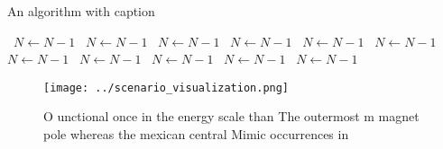 \documentclass[a4paper]{article}
\begin{document}
\begin{algorithm}
\caption{An algorithm with caption}
\begin{algorithmic}
\    \State $N \gets N - 1$
\    \State $N \gets N - 1$
\    \State $N \gets N - 1$
\    \State $N \gets N - 1$
\    \State $N \gets N - 1$
\    \State $N \gets N - 1$
\    \State $N \gets N - 1$
\    \State $N \gets N - 1$
\    \State $N \gets N - 1$
\    \State $N \gets N - 1$
\    \State $N \gets N - 1$
\EndWhile
\end{algorithmic}
\end{algorithm}

\begin{figure}
\centering
\texttt{[image: ../scenario\_visualization.png]}
\caption{O unctional once in the energy scale than The outermost m magnet pole whereas the mexican central Mimic occurrences in 
}
\end{figure}
 
\end{document}
